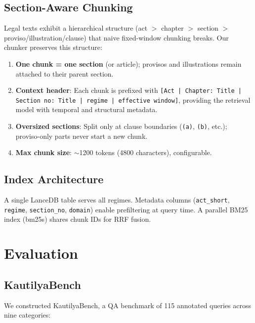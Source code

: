 \documentclass[conference]{IEEEtran}
\begin{document}
\subsection{Section-Aware Chunking}
\label{ssec:chunking}

Legal texts exhibit a hierarchical structure (act $>$ chapter $>$ section $>$ proviso/illustration/clause) that naive fixed-window chunking breaks. Our chunker preserves this structure:

\begin{enumerate}
    \item \textbf{One chunk = one section} (or article); provisos and illustrations remain attached to their parent section.
    \item \textbf{Context header}: Each chunk is prefixed with \texttt{[Act | Chapter: Title | Section no: Title | regime | effective window]}, providing the retrieval model with temporal and structural metadata.
    \item \textbf{Oversized sections}: Split only at clause boundaries (\texttt{(a)}, \texttt{(b)}, etc.); proviso-only parts never start a new chunk.
    \item \textbf{Max chunk size}: $\sim$1200 tokens (4800 characters), configurable.
\end{enumerate}

\subsection{Index Architecture}

A single LanceDB table serves all regimes. Metadata columns (\texttt{act\_short}, \texttt{regime}, \texttt{section\_no}, \texttt{domain}) enable prefiltering at query time. A parallel BM25 index (bm25s) shares chunk IDs for RRF fusion.

\section{Evaluation}
\label{sec:eval}

\subsection{KautilyaBench}

We constructed KautilyaBench, a QA benchmark of 115 annotated queries across nine categories:
\end{document}
